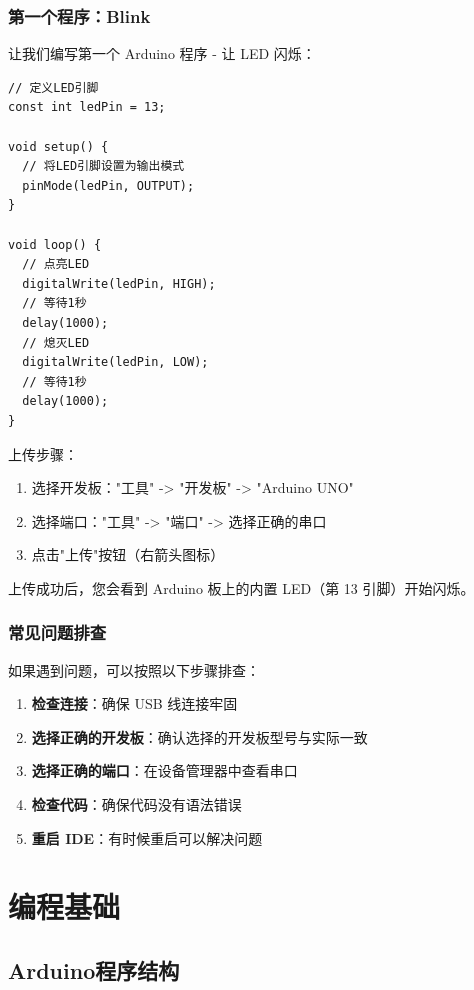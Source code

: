 \documentclass[12pt,UTF8]{ctexbook}
\begin{document}
\section{第一个程序：Blink}

让我们编写第一个 Arduino 程序 - 让 LED 闪烁：

\begin{lstlisting}
// 定义LED引脚
const int ledPin = 13;

void setup() {
  // 将LED引脚设置为输出模式
  pinMode(ledPin, OUTPUT);
}

void loop() {
  // 点亮LED
  digitalWrite(ledPin, HIGH);
  // 等待1秒
  delay(1000);
  // 熄灭LED
  digitalWrite(ledPin, LOW);
  // 等待1秒
  delay(1000);
}
\end{lstlisting}

上传步骤：
\begin{enumerate}
    \item 选择开发板："工具" -> "开发板" -> "Arduino UNO"
    \item 选择端口："工具" -> "端口" -> 选择正确的串口
    \item 点击"上传"按钮（右箭头图标）
\end{enumerate}

上传成功后，您会看到 Arduino 板上的内置 LED（第 13 引脚）开始闪烁。

\section{常见问题排查}

如果遇到问题，可以按照以下步骤排查：

\begin{enumerate}
    \item \textbf{检查连接}：确保 USB 线连接牢固
    \item \textbf{选择正确的开发板}：确认选择的开发板型号与实际一致
    \item \textbf{选择正确的端口}：在设备管理器中查看串口
    \item \textbf{检查代码}：确保代码没有语法错误
    \item \textbf{重启 IDE}：有时候重启可以解决问题
\end{enumerate}

\part{编程基础}

\chapter{Arduino程序结构}
\end{document}
